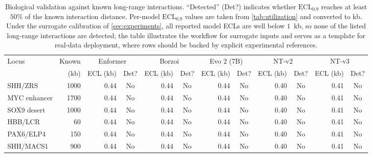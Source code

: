\begin{table}[t]
\centering
\caption{Biological validation against known long-range interactions. ``Detected'' (Det?) indicates whether $\mathrm{ECL}_{0.9}$ reaches at least $50\%$ of the known interaction distance. Per-model $\mathrm{ECL}_{0.9}$ values are taken from \cref{tab:utilization} and converted to kb. Under the surrogate calibration of \cref{sec:experiments}, all reported model ECLs are well below $1$~kb, so none of the listed long-range interactions are detected; the table illustrates the workflow for surrogate inputs and serves as a template for real-data deployment, where rows should be backed by explicit experimental references.}
\label{tab:biological_validation}
\small
\begin{tabular}{lrrcrcrcrcrc}
\toprule
Locus & Known & \multicolumn{2}{c}{Enformer} & \multicolumn{2}{c}{Borzoi} & \multicolumn{2}{c}{Evo 2 (7B)} & \multicolumn{2}{c}{NT-v2} & \multicolumn{2}{c}{NT-v3} \\
 & (kb) & ECL (kb) & Det? & ECL (kb) & Det? & ECL (kb) & Det? & ECL (kb) & Det? & ECL (kb) & Det? \\
\midrule
SHH/ZRS & 1000 & 0.44 & No & 0.44 & No & 0.44 & No & 0.40 & No & 0.41 & No \\
MYC enhancer & 1700 & 0.44 & No & 0.44 & No & 0.44 & No & 0.40 & No & 0.41 & No \\
SOX9 desert & 1000 & 0.44 & No & 0.44 & No & 0.44 & No & 0.40 & No & 0.41 & No \\
HBB/LCR & 60 & 0.44 & No & 0.44 & No & 0.44 & No & 0.40 & No & 0.41 & No \\
PAX6/ELP4 & 150 & 0.44 & No & 0.44 & No & 0.44 & No & 0.40 & No & 0.41 & No \\
SHH/MACS1 & 900 & 0.44 & No & 0.44 & No & 0.44 & No & 0.40 & No & 0.41 & No \\
\bottomrule
\end{tabular}
\end{table}

